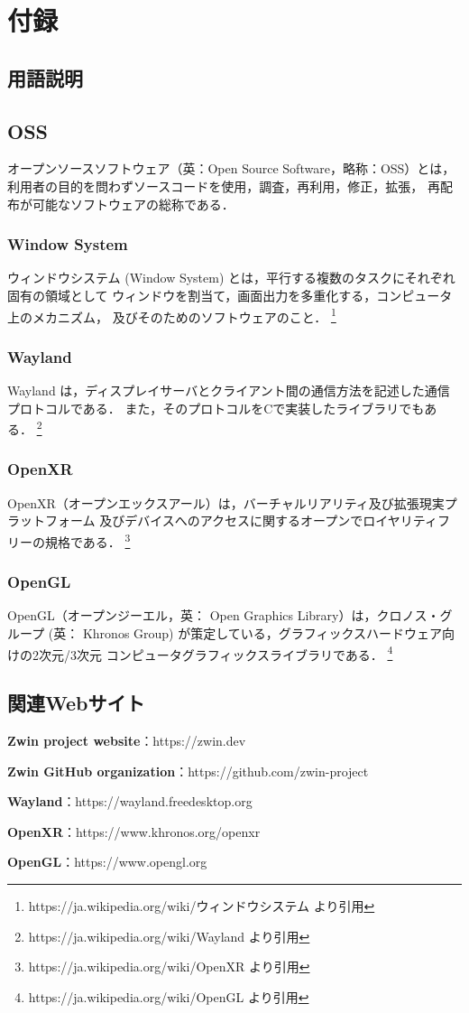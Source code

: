 \section{付録}

\subsection{用語説明}

\subsection*{OSS}
オープンソースソフトウェア（英：Open Source Software，略称：OSS）とは，
利用者の目的を問わずソースコードを使用，調査，再利用，修正，拡張，
再配布が可能なソフトウェアの総称である．

\subsubsection*{Window System}
ウィンドウシステム (Window System) とは，平行する複数のタスクにそれぞれ固有の領域として
ウィンドウを割当て，画面出力を多重化する，コンピュータ上のメカニズム，
及びそのためのソフトウェアのこと．
\footnote{https://ja.wikipedia.org/wiki/ウィンドウシステム より引用}

\subsubsection*{Wayland}
Wayland は，ディスプレイサーバとクライアント間の通信方法を記述した通信プロトコルである．
また，そのプロトコルをCで実装したライブラリでもある．
\footnote{https://ja.wikipedia.org/wiki/Wayland より引用}

\subsubsection*{OpenXR}
OpenXR（オープンエックスアール）は，バーチャルリアリティ及び拡張現実プラットフォーム
及びデバイスへのアクセスに関するオープンでロイヤリティフリーの規格である．
\footnote{https://ja.wikipedia.org/wiki/OpenXR より引用}

\subsubsection*{OpenGL}
OpenGL（オープンジーエル，英： Open Graphics Library）は，クロノス・グループ
(英： Khronos Group) が策定している，グラフィックスハードウェア向けの2次元/3次元
コンピュータグラフィックスライブラリである．
\footnote{https://ja.wikipedia.org/wiki/OpenGL より引用}

\subsection{関連Webサイト}

\textbf{Zwin project website}：https://zwin.dev

\textbf{Zwin GitHub organization}：https://github.com/zwin-project

\textbf{Wayland}：https://wayland.freedesktop.org

\textbf{OpenXR}：https://www.khronos.org/openxr

\textbf{OpenGL}：https://www.opengl.org
